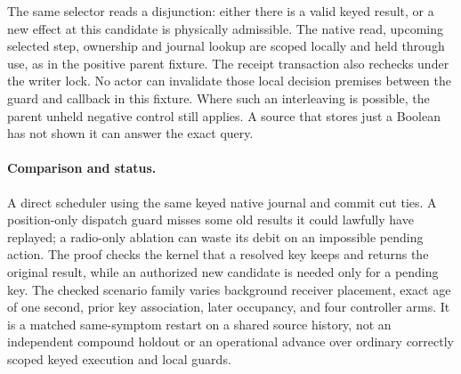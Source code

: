 \documentclass{article}
\begin{document}
The same selector reads a disjunction: either there is a valid
keyed result, or a new effect at this candidate is physically
admissible. The native read, upcoming selected step, ownership
and journal lookup are scoped locally and held through use, as
in the positive parent fixture. The receipt transaction also
rechecks under the writer lock. No actor can invalidate those
local decision premises between the guard and callback in this
fixture. Where such an interleaving is possible, the parent
unheld negative control still applies. A source that stores
just a Boolean has not shown it can answer the exact query.

\paragraph{Comparison and status.}
A direct scheduler using the same keyed native journal and commit
cut ties. A position-only dispatch guard misses some old results
it could lawfully have replayed; a radio-only ablation can waste
its debit on an impossible pending action. The proof checks the
kernel that a resolved key keeps and returns the original result,
while an authorized new candidate is needed only for a pending
key. The checked scenario family varies background receiver
placement, exact age of one second, prior key association,
later occupancy, and four controller arms. It is a matched
same-symptom restart on a shared source history, not an
independent compound holdout or an operational advance over
ordinary correctly scoped keyed execution and local guards.
\end{document}
